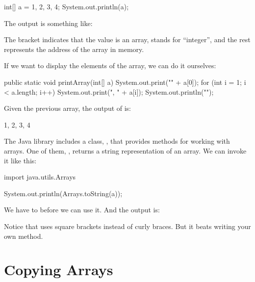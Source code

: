 \begin{code}
int[] a = {1, 2, 3, 4};
System.out.println(a);
\end{code}

The output is something like:

\begin{stdout}
[I@bf3f7e0
\end{stdout}

The bracket indicates that the value is an array,  stands for ``integer'', and the rest represents the address of the array in memory.

If we want to display the elements of the array, we can do it ourselves:

\begin{code}
public static void printArray(int[] a) {
    System.out.print("{" + a[0]);
    for (int i = 1; i < a.length; i++) {
        System.out.print(", " + a[i]);
    }
    System.out.println("}");
}
\end{code}

Given the previous array, the output of  is:

\begin{stdout}
{1, 2, 3, 4}
\end{stdout}


The Java library includes a class, , that provides methods for working with arrays.
One of them, , returns a string representation of an array.
We can invoke it like this:

\begin{code}
import java.utils.Arrays

System.out.println(Arrays.toString(a));
\end{code}

We have to  before we can use it.
And the output is:

\begin{stdout}
[1, 2, 3, 4]
\end{stdout}

Notice that  uses square brackets instead of curly braces.
But it beats writing your own  method.


\section{Copying Arrays}



